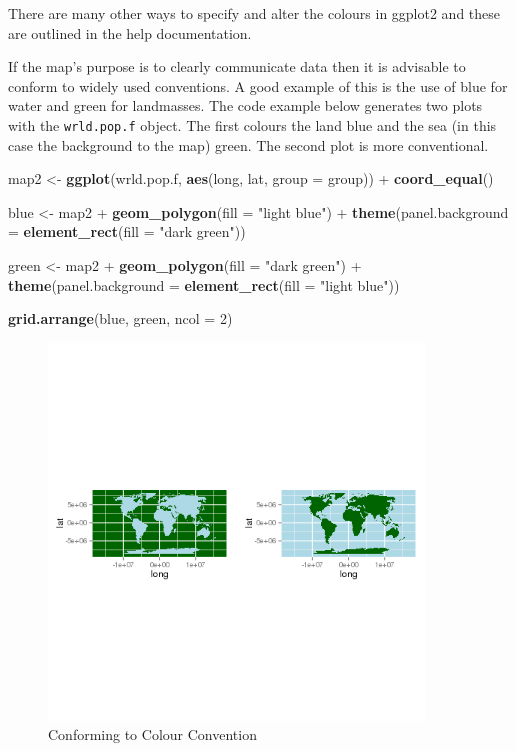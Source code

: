 \documentclass[]{article}
\newenvironment{Shaded}{}{}
\newcommand{\KeywordTok}[1]{\textcolor[rgb]{0.00,0.44,0.13}{\textbf{{#1}}}}
\newcommand{\DataTypeTok}[1]{\textcolor[rgb]{0.56,0.13,0.00}{{#1}}}
\newcommand{\DecValTok}[1]{\textcolor[rgb]{0.25,0.63,0.44}{{#1}}}
\newcommand{\StringTok}[1]{\textcolor[rgb]{0.25,0.44,0.63}{{#1}}}
\newcommand{\NormalTok}[1]{{#1}}
\let\Oldincludegraphics\includegraphics
\renewcommand{\includegraphics}[1]{\Oldincludegraphics[width=10cm]{#1}}
\begin{document}
There are many other ways to specify and alter the colours in ggplot2
and these are outlined in the help documentation.

If the map's purpose is to clearly communicate data then it is advisable
to conform to widely used conventions. A good example of this is the use
of blue for water and green for landmasses. The code example below
generates two plots with the \texttt{wrld.pop.f} object. The first
colours the land blue and the sea (in this case the background to the
map) green. The second plot is more conventional.

\begin{Shaded}
\begin{Highlighting}[]
\NormalTok{map2 <- }\KeywordTok{ggplot}\NormalTok{(wrld.pop.f, }\KeywordTok{aes}\NormalTok{(long, lat, }\DataTypeTok{group =} \NormalTok{group)) + }\KeywordTok{coord_equal}\NormalTok{()}

\NormalTok{blue <- map2 + }\KeywordTok{geom_polygon}\NormalTok{(}\DataTypeTok{fill =} \StringTok{"light blue"}\NormalTok{) + }\KeywordTok{theme}\NormalTok{(}\DataTypeTok{panel.background =} \KeywordTok{element_rect}\NormalTok{(}\DataTypeTok{fill =} \StringTok{"dark green"}\NormalTok{))}

\NormalTok{green <- map2 + }\KeywordTok{geom_polygon}\NormalTok{(}\DataTypeTok{fill =} \StringTok{"dark green"}\NormalTok{) + }\KeywordTok{theme}\NormalTok{(}\DataTypeTok{panel.background =} \KeywordTok{element_rect}\NormalTok{(}\DataTypeTok{fill =} \StringTok{"light blue"}\NormalTok{))}

\KeywordTok{grid.arrange}\NormalTok{(blue, green, }\DataTypeTok{ncol =} \DecValTok{2}\NormalTok{)}
\end{Highlighting}
\end{Shaded}

\begin{figure}[htbp]
\centering
\includegraphics{figure/Conforming_to_Colour_Convention.png}
\caption{Conforming to Colour Convention}
\end{figure}
\end{document}
